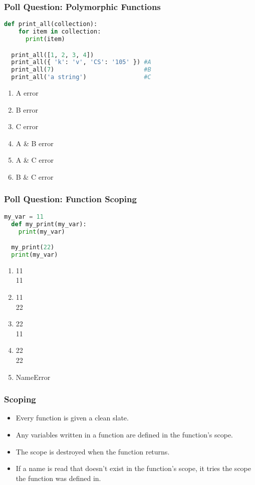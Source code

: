 \documentclass{beamer}
\begin{document}
%
%
\begin{frame}[fragile]
  \frametitle{Poll Question: Polymorphic Functions}
  \begin{lstlisting}[language=Python, autogobble]
  def print_all(collection):
    for item in collection:
      print(item)

  print_all([1, 2, 3, 4])
  print_all({ 'k': 'v', 'CS': '105' }) #A
  print_all(7)                         #B
  print_all('a string')                #C
  \end{lstlisting}
  \vfill
  \begin{enumerate}[A]
    \item A error
    \item B error
    \item C error
    \item A \& B error
    \item A \& C error
    \item B \& C error
  \end{enumerate}
\end{frame}


%
%
\begin{frame}[fragile]
  \frametitle{Poll Question: Function Scoping}
  \begin{lstlisting}[language=Python, autogobble]
  my_var = 11
  def my_print(my_var):
    print(my_var)

  my_print(22)
  print(my_var)
  \end{lstlisting}
  \vfill
  \begin{enumerate}[A]
    \item 11\\11
    \item 11\\22
    \item 22\\11
    \item 22\\22
    \item NameError
  \end{enumerate}
\end{frame}


%
%
\begin{frame}[fragile]
  \frametitle{Scoping}
  \begin{itemize}
    \item Every function is given a clean slate.
    \item Any variables written in a function are defined in the function's scope.
    \item The scope is destroyed when the function returns.
    \item If a name is read that doesn't exist in the function's scope, it tries the scope the function was defined in.
  \end{itemize}
\end{frame}
\end{document}
